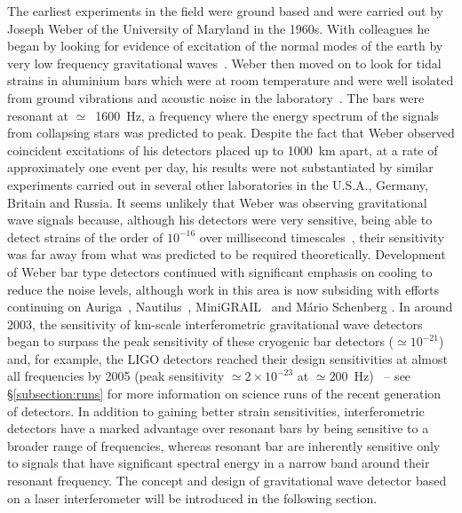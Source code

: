 \documentclass{article}
\begin{document}
The earliest experiments in the field were ground based and were carried out by
Joseph Weber of the University of Maryland in the 1960s. With colleagues he
began by looking for evidence of excitation of the normal modes of the earth by
very low frequency gravitational waves~\cite{Forward2}. Weber then moved on to
look for tidal strains in aluminium bars which were at room temperature and were
well isolated from ground vibrations and acoustic noise in the
laboratory~\cite{Weber1, Weber2}. The bars were resonant at $\simeq$~1600~Hz, a
frequency where the energy spectrum of the signals from collapsing stars was
predicted to peak. Despite the fact that Weber observed coincident excitations
of his detectors placed up to 1000~km apart, at a rate of approximately one
event per day, his results were not substantiated by similar experiments carried
out in several other laboratories in the U.S.A., Germany, Britain and Russia. It
seems unlikely that Weber was observing gravitational wave signals because,
although his detectors were very sensitive, being able to detect strains of the
order of $10^{-16}$ over millisecond timescales~\cite{Weber1}, their sensitivity
was far away from what was predicted to be required theoretically. Development
of Weber bar type detectors continued with significant emphasis on cooling to
reduce the noise levels, although work in this area is now subsiding with
efforts continuing on Auriga~\cite{AURIGA}, Nautilus~\cite{NAUTILUS},
MiniGRAIL~\cite{MiniGRAIL, Gottardi:2007} and M\'{a}rio Schenberg
\cite{Schenberg, Aguiar:2006}.  In around 2003, the sensitivity of km-scale
interferometric gravitational wave detectors began to surpass the peak
sensitivity of these cryogenic bar detectors ($\simeq 10^{-21}$) 
and, for example, the LIGO detectors reached their design sensitivities at
almost all frequencies by 2005 (peak sensitivity $\simeq 2\times10^{-23}$ at 
$\simeq200$~Hz)~\cite{Whitcomb:2008} -- see \S\ref{subsection:runs} for more
information on science runs of the recent generation of detectors.  In addition
to gaining better strain sensitivities, interferometric detectors have a marked
advantage over resonant bars by being sensitive to a broader range of
frequencies, whereas resonant bar are inherently sensitive only to signals that
have significant spectral energy in a narrow band around their resonant
frequency. The concept and design of gravitational wave detector based on a
laser interferometer will be introduced in the following section.


\end{document}
